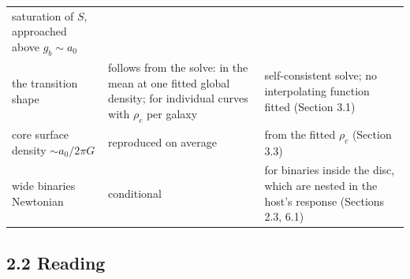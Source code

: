 \documentclass[
  10pt,
]{article}
\begin{document}
\begin{longtable}[]{@{}lll@{}}
\begin{minipage}[t]{0.50\columnwidth}
saturation of $S$, approached above $g_b\sim a_0$\strut
\end{minipage}\tabularnewline
\begin{minipage}[t]{0.24\columnwidth}\raggedright
the transition shape\strut
\end{minipage} & \begin{minipage}[t]{0.20\columnwidth}\raggedright
follows from the solve: in the mean at one fitted global density; for individual curves with $\rho_c$ per galaxy\strut
\end{minipage} & \begin{minipage}[t]{0.50\columnwidth}\raggedright
self-consistent solve; no interpolating function fitted (Section 3.1)\strut
\end{minipage}\tabularnewline
\begin{minipage}[t]{0.24\columnwidth}\raggedright
core surface density $\sim a_0/2\pi G$\strut
\end{minipage} & \begin{minipage}[t]{0.20\columnwidth}\raggedright
reproduced on average\strut
\end{minipage} & \begin{minipage}[t]{0.50\columnwidth}\raggedright
from the fitted $\rho_c$ (Section 3.3)\strut
\end{minipage}\tabularnewline
\begin{minipage}[t]{0.24\columnwidth}\raggedright
wide binaries Newtonian\strut
\end{minipage} & \begin{minipage}[t]{0.20\columnwidth}\raggedright
conditional\strut
\end{minipage} & \begin{minipage}[t]{0.50\columnwidth}\raggedright
for binaries inside the disc, which are nested in the host's response (Sections 2.3, 6.1)\strut
\end{minipage}\tabularnewline
\bottomrule
\end{longtable}

\subsection{2.2 Reading}\label{reading}
\end{document}

